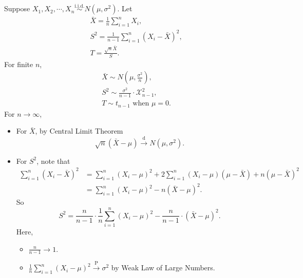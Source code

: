 \documentclass[a4paper]{article}
\begin{document}
\begin{eg}
	Suppose $X_1,X_2,\cdots,X_n \stackrel{\text{i.i.d.}}{\sim} N(\mu,\sigma^2)$. Let
	\begin{equation*}
		\begin{aligned}
			& \bar{X} = \frac{1}{n} \sum\limits_{i=1}^nX_i, \\
			& S^2 = \frac{1}{n-1} \sum\limits_{i=1}^n(X_i-\bar{X})^2, \\
			& T = \frac{\sqrt{n}\bar{X}}{S}.
		\end{aligned}
	\end{equation*}
	For finite $n$,
	\begin{equation*}
		\begin{aligned}
			& \bar{X} \sim N\left(\mu,\frac{\sigma^2}{n}\right), \\
			& S^2 \sim \frac{\sigma^2}{n-1} \cdot \mathcal{X}_{n-1}^2, \\
			& T \sim t_{n-1} \text{ when } \mu = 0.
		\end{aligned}
	\end{equation*}
	\newpage
	\noindent For $n \to \infty$,
	\begin{itemize}[leftmargin=*]
		\item For $\bar{X}$, by Central Limit Theorem
		\begin{equation}
			\sqrt{n}(\bar{X}-\mu) \stackrel{\text{d}}{\longrightarrow} N(\mu,\sigma^2).
		\end{equation}
		\item For $S^2$, note that
		\begin{equation*}
			\begin{aligned}
				\sum\limits_{i=1}^n(X_i-\bar{X})^2 &= \sum\limits_{i=1}^n(X_i - \mu)^2 + 2\sum\limits_{i=1}^n(X_i-\mu)(\mu - \bar{X}) + n(\mu - \bar{X})^2 \\
				&= \sum\limits_{i=1}^n(X_i - \mu)^2 - n(\bar{X} - \mu)^2.
			\end{aligned}
		\end{equation*}
		So
		\begin{equation*}
			S^2 = \frac{n}{n-1} \cdot \frac{1}{n} \sum\limits_{i=1}^n(X_i-\mu)^2 - \frac{n}{n-1} \cdot (\bar{X} - \mu)^2.
		\end{equation*}
		Here,
		\begin{itemize}
			\item $\frac{n}{n-1} \to 1$.
			\item $\frac{1}{n}\sum\limits_{i=1}^n(X_i-\mu)^2 \stackrel{\text{P}}{\longrightarrow} \sigma^2$ by Weak Law of Large Numbers.

\end{itemize}
\end{itemize}
\end{eg}
\end{document}

